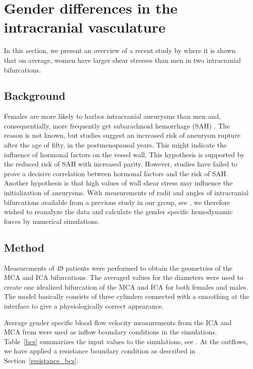 \section{Gender differences in the intracranial vasculature} \label{gender}

In this section, we present an overview of a recent study
by \citet{LindekleivValen-SendstadMorganEtAl2010} where it is shown
that on average, women have larger shear stresses than men in two
intracranial bifurcations.

\subsection{Background}

Females are more likely to harbor intracranial aneurysms than men and,
consequentially, more frequently get subarachnoid hemorrhage
(SAH) \citep{EdenMeurerSanchezEtAl2008}. The reason is not
known, but studies suggest an increased risk of aneurysm rupture after
the age of fifty, in the postmenopausal years. This might indicate the
influence of hormonal factors on the vessel wall. This hypothesis is
supported by the reduced risk of SAH with increased parity. However,
studies have failed to prove a decisive correlation between hormonal
factors and the risk of SAH. Another hypothesis is that high values of
wall shear stress may influence the initialization of aneurysms. With
measurements of radii and angles of intracranial bifurcations
available from a previous study in our group,
see \citet{IngebrigtsenMorganFaulderEtAl2004}, we therefore wished to
reanalyze the data and calculate the gender specific hemodynamic
forces by numerical simulations.

\subsection{Method}

Measurements of 49 patients were performed to obtain the geometries of
the MCA and ICA bifurcations. The averaged values for the diameters
were used to create one idealized
bifurcation of the MCA and ICA for both females and males. The model
basically consists of three cylinders connected with a smoothing at
the interface to give a physiologically correct appearance.

Average gender specific blood flow velocity measurements from the ICA
and MCA from \citet{KrejzaSzydlikLiebeskindEtAl2005} were used as
inflow boundary conditions in the simulations. Table~\ref{bcs}
summarizes the input values to the simulations,
see \citet{LindekleivValen-SendstadMorganEtAl2010}.  At the outflows,
we have applied a resistance boundary condition as described in
Section~\ref{resistance_bcs}.

